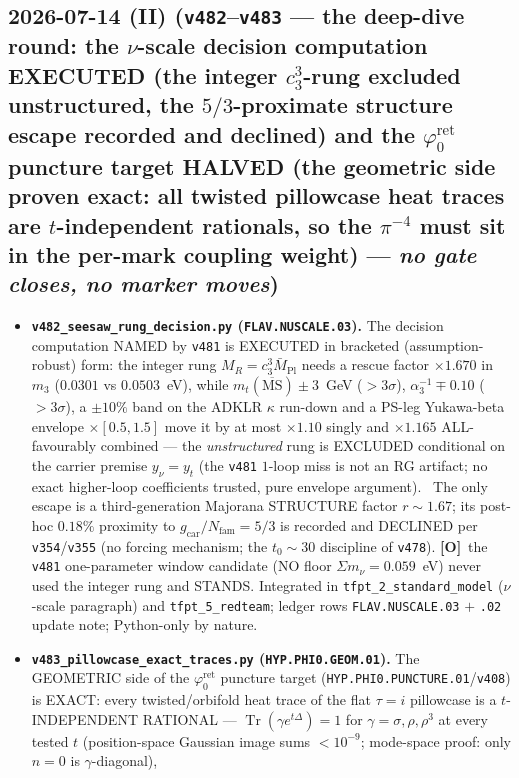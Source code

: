 \documentclass[11pt]{article}
\providecommand{\mO}{\textbf{[O]}}\providecommand{\mX}{\textbf{[X]}}
\providecommand{\cthree}{c_3}\providecommand{\phiz}{\varphi_0^{\mathrm{ret}}}
\providecommand{\gcar}{g_{\mathrm{car}}}\providecommand{\Nfam}{N_{\mathrm{fam}}}
\providecommand{\Mbar}{\bar M_{\mathrm{Pl}}}\providecommand{\Z}{\mathbb{Z}}\providecommand{\PP}{\mathbb{P}}
\begin{document}
\subsection*{2026-07-14 (II) (\texttt{v482}--\texttt{v483} --- the deep-dive round: the $\nu$-scale decision computation EXECUTED (the integer $\cthree^3$-rung excluded unstructured, the $5/3$-proximate structure escape recorded and declined) and the $\phiz$ puncture target HALVED (the geometric side proven exact: all twisted pillowcase heat traces are $t$-independent rationals, so the $\pi^{-4}$ must sit in the per-mark coupling weight) --- \emph{no gate closes, no marker moves})}
\begin{itemize}[leftmargin=1.5em]
\item \textbf{\texttt{v482\_seesaw\_rung\_decision.py} (\texttt{FLAV.NUSCALE.03}).} The decision
computation NAMED by \texttt{v481} is EXECUTED in bracketed (assumption-robust) form: the integer rung
$M_R=\cthree^3\Mbar$ needs a rescue factor $\times1.670$ in $m_3$ ($0.0301$ vs $0.0503$~eV), while
$m_t(\overline{\mathrm{MS}})\pm3$~GeV ($>3\sigma$), $\alpha_3^{-1}\mp0.10$ ($>3\sigma$), a $\pm10\%$ band
on the ADKLR $\kappa$ run-down and a PS-leg Yukawa-beta envelope $\times[0.5,1.5]$ move it by at most
$\times1.10$ singly and $\times1.165$ ALL-favourably combined --- the \emph{unstructured} rung is
EXCLUDED conditional on the carrier premise $y_\nu{=}y_t$ (the \texttt{v481} $1$-loop miss is not an RG
artifact; no exact higher-loop coefficients trusted, pure envelope argument). \mC\ The only escape is a
third-generation Majorana STRUCTURE factor $r\sim1.67$; its post-hoc $0.18\%$ proximity to
$\gcar/\Nfam=5/3$ is recorded and DECLINED per \texttt{v354}/\texttt{v355} (no forcing mechanism; the
$t_0{\sim}30$ discipline of \texttt{v478}). \mO\ the \texttt{v481} one-parameter window candidate (NO
floor $\Sigma m_\nu{=}0.059$~eV) never used the integer rung and STANDS. Integrated in
\texttt{tfpt\_2\_standard\_model} ($\nu$-scale paragraph) and \texttt{tfpt\_5\_redteam}; ledger rows
\texttt{FLAV.NUSCALE.03} $+$ \texttt{.02} update note; Python-only by nature.
\item \textbf{\texttt{v483\_pillowcase\_exact\_traces.py} (\texttt{HYP.PHI0.GEOM.01}).} The GEOMETRIC
side of the $\phiz$ puncture target (\texttt{HYP.PHI0.PUNCTURE.01}/\texttt{v408}) is EXACT: every
twisted/orbifold heat trace of the flat $\tau{=}i$ pillowcase is a $t$-INDEPENDENT RATIONAL ---
$\operatorname{Tr}(\gamma e^{t\Delta})=1$ for $\gamma=\sigma,\rho,\rho^3$ at every tested $t$
(position-space Gaussian image sums $<10^{-9}$; mode-space proof: only $n{=}0$ is $\gamma$-diagonal),

\end{itemize}
\end{document}
